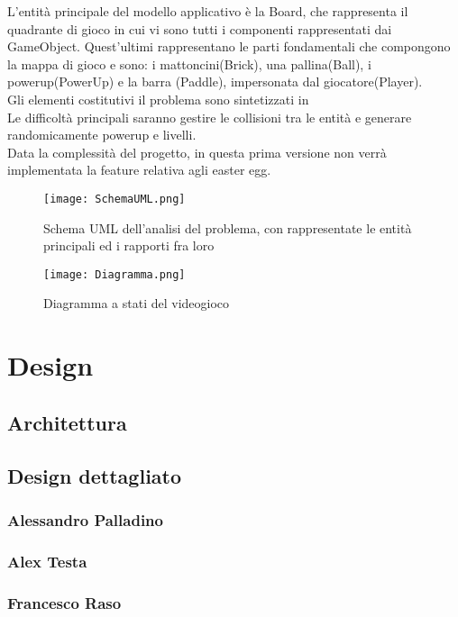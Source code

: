 \documentclass[a4paper,12pt]{report}
\begin{document}
L'entità principale del modello applicativo è la Board, che rappresenta il quadrante di gioco in cui vi sono tutti i componenti rappresentati dai GameObject. Quest'ultimi rappresentano le parti fondamentali che compongono la mappa di gioco e sono: i mattoncini(Brick), una pallina(Ball), i powerup(PowerUp) e la barra (Paddle), impersonata dal giocatore(Player).
\\
Gli elementi costitutivi il problema sono sintetizzati in %
\\
Le difficoltà principali saranno gestire le collisioni tra le entità e generare randomicamente powerup e livelli.
\\
Data la complessità del progetto, in questa prima versione non verrà implementata la feature relativa agli easter egg.


\begin{figure}[h]
\centering{}
 \texttt{[image: SchemaUML.png]}
\caption{Schema UML dell'analisi del problema, con rappresentate le entità principali ed i rapporti fra loro}
\label{SchemaUML}

\texttt{[image: Diagramma.png]}
\caption{Diagramma a stati del videogioco}
\label{Diagramma}

\end{figure}

\chapter{Design}
\section{Architettura}
\section{Design dettagliato}
    \subsection*{Alessandro Palladino}
    
    
    \subsection*{Alex Testa}
    
    
    \subsection*{Francesco Raso}
    
\end{document}

